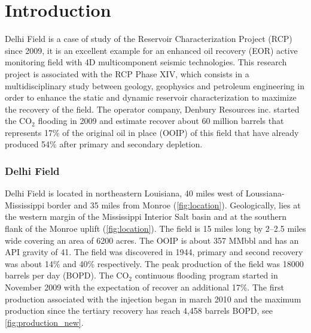 \chapter{Introduction}
Delhi Field is a case of study of the Reservoir Characterization Project (RCP)
since 2009, it is an excellent example for an enhanced oil recovery (EOR) 
active monitoring field with 4D multicomponent seismic technologies. This research
project is associated with the RCP Phase XIV, which consists in a multidisciplinary study 
between geology, geophysics and petroleum engineering in order to enhance the 
static and dynamic reservoir characterization to maximize the recovery of the field. 
The operator company, Denbury Resources inc. started the CO$_2$ flooding in 2009 and estimate
recover about 60 million barrels that represents 17\% of the original oil in place
(OOIP) of this field that have already produced 54\% after primary and secondary depletion.


\subsection{Delhi Field}

Delhi Field is located in northeastern Louisiana, 40 miles west of 
Loussiana-Mississippi border and 35 miles from Monroe (\ref{fig:location}).
Geologically, lies at the western margin of the Mississippi Interior Salt basin
\cite{ref:alam} and at the southern flank of the Monroe uplift \cite{ref:bloomer} 
(\ref{fig:location}). The field is 15 miles long by 2--2.5 miles wide covering an
area of 6200 acres. The OOIP is about 357 MMbbl and has an API gravity of 41. 
The field was discovered in 1944, primary and second recovery was about 14\% and 40\%
respectively. The peak production of the field was 18000 barrels per day (BOPD). 
The CO$_2$ continuous flooding program started in November 2009 with the expectation
 of recover an additional 17\%. The first production associated with the injection began
 in march 2010 and the maximum production since the tertiary 
recovery has reach 4,458 barrels BOPD, see \ref{fig:production_new}. 


